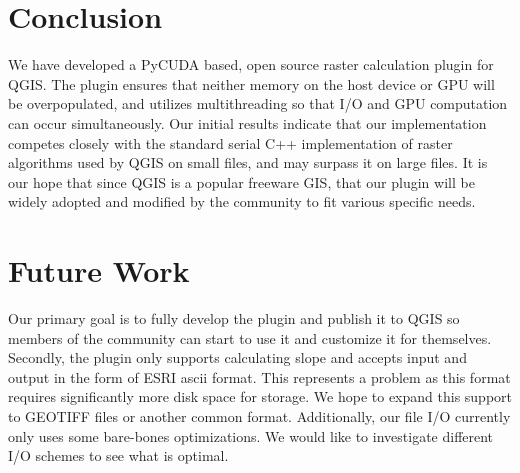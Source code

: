 \documentclass[journal]{IEEEtran}
\begin{document}
\section{Conclusion}
We have developed a PyCUDA based, open source raster calculation plugin for
QGIS. The plugin ensures that neither memory on the host device or GPU will be
overpopulated, and utilizes multithreading so that I/O and GPU computation can
occur simultaneously. Our initial results indicate that our implementation
competes closely with the standard serial C++ implementation of raster
algorithms used by QGIS on small files, and may surpass it on large files.  It
is our hope that since QGIS is a popular freeware GIS, that our plugin will be
widely adopted and modified by the community to fit various specific needs.

\section{Future Work}
Our primary goal is to fully develop the plugin and publish it to QGIS so
members of the community can start to use it and customize it for themselves.
Secondly, the plugin only supports calculating slope and accepts input and
output in the form of ESRI ascii format. This represents a problem as this
format requires significantly more disk space for storage. We hope to expand
this support to GEOTIFF files or another common format. Additionally, our file
I/O currently only uses some bare-bones optimizations. We would like to
investigate different I/O schemes to see what is optimal.

\ifCLASSOPTIONcaptionsoff
  \newpage
\fi





\end{document}
